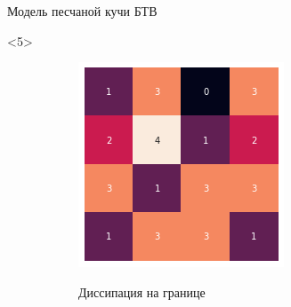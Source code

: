 \documentclass{beamer}
\begin{document}
\begin{frame}{Модель песчаной кучи БТВ}
		\begin{onlyenv}<5>
			\begin{figure}[ht]
				\centering
				\begin{subfigure}{0.45\textwidth}
					\includegraphics[width=\linewidth]{slides/btw_4}
				\end{subfigure}
				\begin{subfigure}{0.45\textwidth}
					Диссипация на границе
				\end{subfigure}
			\end{figure}
		\end{onlyenv}
		

\end{frame}
\end{document}
